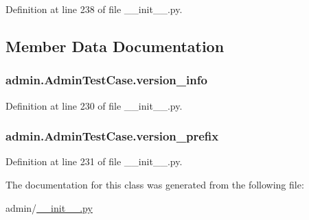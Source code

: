 Definition at line 238 of file \-\_\-\-\_\-init\-\_\-\-\_\-.\-py.



\subsection{Member Data Documentation}
\hypertarget{classadmin_1_1AdminTestCase_a235ad774d40bba3600cf09b79dc9f209}{
\subsubsection[{version\-\_\-info}]{\setlength{\rightskip}{0pt plus 5cm}admin.\-Admin\-Test\-Case.\-version\-\_\-info}}\label{classadmin_1_1AdminTestCase_a235ad774d40bba3600cf09b79dc9f209}


Definition at line 230 of file \-\_\-\-\_\-init\-\_\-\-\_\-.\-py.

\hypertarget{classadmin_1_1AdminTestCase_a6b12aab33be61651698f4b8810678168}{
\subsubsection[{version\-\_\-prefix}]{\setlength{\rightskip}{0pt plus 5cm}admin.\-Admin\-Test\-Case.\-version\-\_\-prefix}}\label{classadmin_1_1AdminTestCase_a6b12aab33be61651698f4b8810678168}


Definition at line 231 of file \-\_\-\-\_\-init\-\_\-\-\_\-.\-py.



The documentation for this class was generated from the following file\-:\begin{DoxyCompactItemize}
\item 
admin/\hyperlink{____init_____8py}{\-\_\-\-\_\-init\-\_\-\-\_\-.\-py}\end{DoxyCompactItemize}
